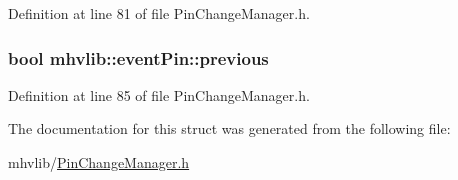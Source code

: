 Definition at line 81 of file Pin\-Change\-Manager.\-h.

\hypertarget{structmhvlib_1_1event_pin_af5233c774e93080e309e09734d4a93f4}{
\subsubsection[{previous}]{\setlength{\rightskip}{0pt plus 5cm}bool mhvlib\-::event\-Pin\-::previous}}\label{structmhvlib_1_1event_pin_af5233c774e93080e309e09734d4a93f4}


Definition at line 85 of file Pin\-Change\-Manager.\-h.



The documentation for this struct was generated from the following file\-:\begin{DoxyCompactItemize}
\item 
mhvlib/\hyperlink{_pin_change_manager_8h}{Pin\-Change\-Manager.\-h}\end{DoxyCompactItemize}
